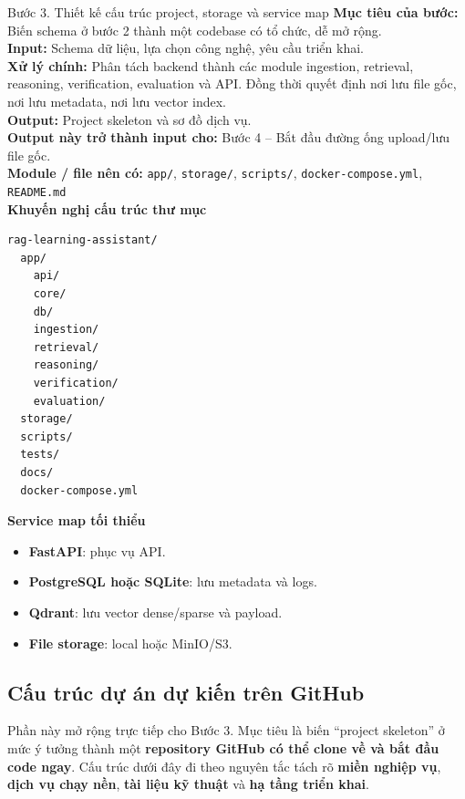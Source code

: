 \documentclass[12pt,a4paper]{article}
\newcommand{\stepgoal}[1]{\textbf{Mục tiêu của bước:} #1\\}
\newcommand{\stepinput}[1]{\textbf{Input:} #1\\}
\newcommand{\stepprocess}[1]{\textbf{Xử lý chính:} #1\\}
\newcommand{\stepoutput}[1]{\textbf{Output:} #1\\}
\newcommand{\stepnext}[1]{\textbf{Output này trở thành input cho:} #1\\}
\newcommand{\stepmodules}[1]{\textbf{Module / file nên có:} #1\\}
\begin{document}
\begin{stepbox}{Bước 3. Thiết kế cấu trúc project, storage và service map}
\stepgoal{Biến schema ở bước 2 thành một codebase có tổ chức, dễ mở rộng.}
\stepinput{Schema dữ liệu, lựa chọn công nghệ, yêu cầu triển khai.}
\stepprocess{Phân tách backend thành các module ingestion, retrieval, reasoning, verification, evaluation và API. Đồng thời quyết định nơi lưu file gốc, nơi lưu metadata, nơi lưu vector index.}
\stepoutput{Project skeleton và sơ đồ dịch vụ.}
\stepnext{Bước 4 -- Bắt đầu đường ống upload/lưu file gốc.}
\stepmodules{\texttt{app/}, \texttt{storage/}, \texttt{scripts/}, \texttt{docker-compose.yml}, \texttt{README.md}}

\textbf{Khuyến nghị cấu trúc thư mục}
\begin{lstlisting}
rag-learning-assistant/
  app/
    api/
    core/
    db/
    ingestion/
    retrieval/
    reasoning/
    verification/
    evaluation/
  storage/
  scripts/
  tests/
  docs/
  docker-compose.yml
\end{lstlisting}

\textbf{Service map tối thiểu}
\begin{itemize}
    \item \textbf{FastAPI}: phục vụ API.
    \item \textbf{PostgreSQL hoặc SQLite}: lưu metadata và logs.
    \item \textbf{Qdrant}: lưu vector dense/sparse và payload.
    \item \textbf{File storage}: local hoặc MinIO/S3.
\end{itemize}
\end{stepbox}


\subsection{Cấu trúc dự án dự kiến trên GitHub}

Phần này mở rộng trực tiếp cho Bước 3. Mục tiêu là biến ``project skeleton'' ở mức ý tưởng thành một \textbf{repository GitHub có thể clone về và bắt đầu code ngay}. Cấu trúc dưới đây đi theo nguyên tắc tách rõ \textbf{miền nghiệp vụ}, \textbf{dịch vụ chạy nền}, \textbf{tài liệu kỹ thuật} và \textbf{hạ tầng triển khai}.
\end{document}
